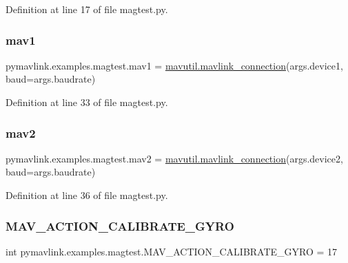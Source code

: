 Definition at line 17 of file magtest.\+py.

\mbox{\label{namespacepymavlink_1_1examples_1_1magtest_af56e58adebd478f91d306c5a095c9e4d}} 
\subsubsection{\texorpdfstring{mav1}{mav1}}
{\footnotesize\ttfamily pymavlink.\+examples.\+magtest.\+mav1 = \mbox{\hyperlink{namespacepymavlink_1_1mavutil_aa6c4b8861f86ef3bb746fa0fab241c93}{mavutil.\+mavlink\+\_\+connection}}(args.\+device1, baud=args.\+baudrate)}



Definition at line 33 of file magtest.\+py.

\mbox{\label{namespacepymavlink_1_1examples_1_1magtest_a3516235c2a928876739d7982bd9f5577}} 
\subsubsection{\texorpdfstring{mav2}{mav2}}
{\footnotesize\ttfamily pymavlink.\+examples.\+magtest.\+mav2 = \mbox{\hyperlink{namespacepymavlink_1_1mavutil_aa6c4b8861f86ef3bb746fa0fab241c93}{mavutil.\+mavlink\+\_\+connection}}(args.\+device2, baud=args.\+baudrate)}



Definition at line 36 of file magtest.\+py.

\mbox{\label{namespacepymavlink_1_1examples_1_1magtest_a8b7b677aa683b3117014b1b8c4c6587a}} 
\subsubsection{\texorpdfstring{MAV\_ACTION\_CALIBRATE\_GYRO}{MAV\_ACTION\_CALIBRATE\_GYRO}}
{\footnotesize\ttfamily int pymavlink.\+examples.\+magtest.\+M\+A\+V\+\_\+\+A\+C\+T\+I\+O\+N\+\_\+\+C\+A\+L\+I\+B\+R\+A\+T\+E\+\_\+\+G\+Y\+RO = 17}



